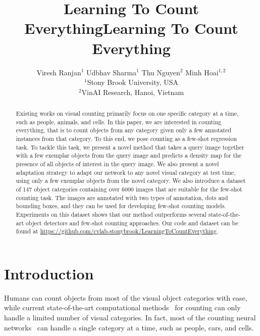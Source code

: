 \title{Learning To Count Everything}



\title{Learning To Count Everything}

\author{Viresh Ranjan$^{1}$ \quad Udbhav Sharma$^{1}$  \quad Thu Nguyen$^{2}$ \quad Minh Hoai$^{1,2}$ \\
$^1$Stony Brook University, USA\\
$^2$VinAI Research, Hanoi, Vietnam 
}

\maketitle

\begin{abstract}
Existing works on visual counting primarily focus on one specific category at a time, such as people, animals, and cells. In this paper, we are interested in counting everything, that is to count objects from any category given only a few annotated instances from that category.
To this end, we pose counting as a few-shot regression task. 
To tackle this task, we present a novel method that takes a query image together with a few exemplar objects from the query image and predicts a density map for the presence of all objects of interest in the query image. We also present a novel adaptation strategy to adapt our network to any novel visual category at test time, using only a few exemplar objects from the novel category.  We also introduce a dataset of 147 object categories containing over 6000 images that are suitable for the few-shot counting task. The images are annotated with two types of annotation, dots and bounding boxes, and they can be used for developing few-shot counting models. Experiments on this dataset shows that our method outperforms several state-of-the-art object detectors and few-shot counting approaches. Our code and dataset can be found at \url{https://github.com/cvlab-stonybrook/LearningToCountEverything}. 

\end{abstract}

\section{Introduction}
Humans can count objects from most of the visual object categories with ease, while  current state-of-the-art computational  methods~\cite{zhang2016single,ma2019bayesian,m_Wang-etal-NIPS20} for counting can only handle a limited number of visual categories. In fact, most of the counting neural networks~\cite{arteta2016counting,m_Wang-etal-NIPS20} can handle a single category at a time, such as people, cars, and cells. 

